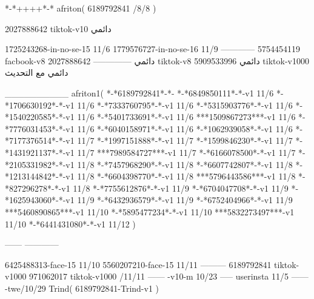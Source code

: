 *-*++++*-*
afriton(
6189792841 /8/8
)

2027888642 tiktok-v10
دائمي

1725243268-in-no-se-15 11/6
1779576727-in-no-se-16 11/9
------------
5754454119 facbook-v8
دائمي
--------------
2027888642 tiktok-v8
دائمي
5909533996 tiktok-v1000
دائمي مع التحديث

__________
afriton1(
*-*6189792841*-*-
*-*6849850111*-*-v1 11/6
*-*1706630192*-*-v1 11/6
*-*7333760795*-*-v1 11/6
*-*5315903776*-*-v1 11/6
*-*1540220585*-*-v1 11/6
*-*5401733691*-*-v1 11/6
***1509867273***-v1 11/6
*-*7776031453*-*-v1 11/6
*-*6040158971*-*-v1 11/6
*-*1062939058*-*-v1 11/6
*-*7177376514*-*-v1 11/7
*-*1997151888*-*-v1 11/7
*-*1599846230*-*-v1 11/7
*-*1431921137*-*-v1 11/7
***7989584727***-v1 11/7
*-*6166078500*-*-v1 11/7
*-*2105331982*-*-v1 11/8
*-*7457968290*-*-v1 11/8
*-*6607742807*-*-v1 11/8
*-*1213144842*-*-v1 11/8
*-*6604398770*-*-v1 11/8
***5796443586***-v1 11/8
*-*827296278*-*-v1 11/8
*-*7755612876*-*-v1 11/9
*-*6704047708*-*-v1 11/9
*-*1625943060*-*-v1 11/9
*-*6432936579*-*-v1 11/9
*-*6752404966*-*-v1 11/9
***5460890865***-v1 11/10
*-*5895477234*-*-v1 11/10
***5832273497***-v1 11/10
*-*6441431080*-*-v1 11/12
)

------
------------

6425488313-face-15 11/10
5560207210-face-15 11/11
---------
6189792841 tiktok-v1000
971062017 tiktok-v1000 /11/11
------
-v10-m 10/23
-----
userinsta 11/5
------
-twe/10/29
Trind(
6189792841-Trind-v1 
)
